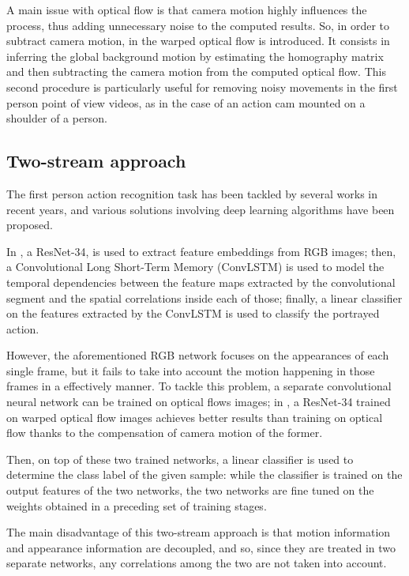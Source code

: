 \documentclass[10pt,twocolumn,letterpaper]{article}
\begin{document}
A main issue with optical flow is that camera motion highly influences the process, thus adding unnecessary noise to the computed results. So, in order to subtract camera motion, in \cite{wang2013trajectiories} the warped optical flow is introduced. It consists in inferring the global background motion by estimating the homography matrix and then subtracting the camera motion from the computed optical flow. This second procedure is particularly useful for removing noisy movements in the first person point of view videos, as in the case of an action cam mounted on a shoulder of a person.

\subsection{Two-stream approach}
\label{par:Ego-RNN}

The first person action recognition task has been tackled by several works in recent years, and various solutions involving deep learning algorithms have been proposed.

In \cite{Ego-RNN}, a ResNet-34, is used to extract feature embeddings from RGB images; then, a Convolutional Long Short-Term Memory (ConvLSTM) is used to model the temporal dependencies between the feature maps extracted by the convolutional segment and the spatial correlations inside each of those; finally, a linear classifier on the features extracted by the ConvLSTM is used to classify the portrayed action.

However, the aforementioned RGB network focuses on the appearances of each single frame, but it fails to take into account the motion happening in those frames in a effectively manner. To tackle this problem, a separate convolutional neural network can be trained on optical flows images; in \cite{Ego-RNN}, a ResNet-34 trained on warped optical flow images achieves better results than training on optical flow thanks to the compensation of camera motion of the former.

Then, on top of these two trained networks, a linear classifier is used to determine the class label of the given sample: while the classifier is trained on the output features of the two networks, the two networks are fine tuned on the weights obtained in a preceding set of training stages.

The main disadvantage of this two-stream approach is that motion information and appearance information are decoupled, and so, since they are treated in two separate networks, any correlations among the two are not taken into account.
\end{document}
